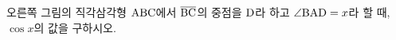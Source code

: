 \noindent\begin{minipage}[t]{0.58\linewidth}\vspace{0pt}\raggedright 오른쪽 그림의 직각삼각형 $\mathrm{ABC}$에서 $\overline{\mathrm{BC}}$의 중점을 $\mathrm{D}$라 하고 $\angle\mathrm{BAD}=x$라 할 때, $\cos x$의 값을 구하시오.\end{minipage}\hfill\begin{minipage}[t]{0.4\linewidth}\vspace{0pt}\centering \resizebox{\ifdim\width>\linewidth\linewidth\else\width\fi}{!}{}\end{minipage}\par
